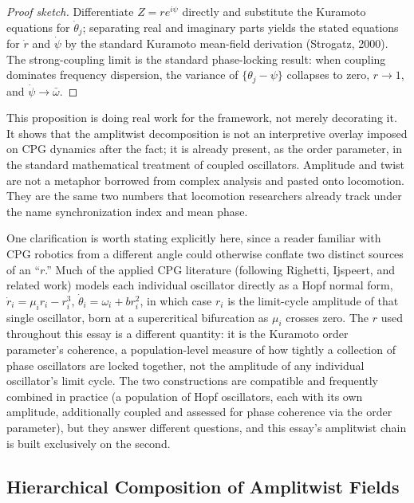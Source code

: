 \documentclass[12pt]{article}
\begin{document}
\begin{proof}[Proof sketch]
Differentiate $Z = r e^{i\psi}$ directly and substitute the Kuramoto equations for $\dot\theta_j$; separating real and imaginary parts yields the stated equations for $\dot r$ and $\dot\psi$ by the standard Kuramoto mean-field derivation (Strogatz, 2000). The strong-coupling limit is the standard phase-locking result: when coupling dominates frequency dispersion, the variance of $\{\theta_j - \psi\}$ collapses to zero, $r \to 1$, and $\dot\psi \to \bar\omega$.
\end{proof}

This proposition is doing real work for the framework, not merely decorating it. It shows that the amplitwist decomposition is not an interpretive overlay imposed on CPG dynamics after the fact; it is already present, as the order parameter, in the standard mathematical treatment of coupled oscillators. Amplitude and twist are not a metaphor borrowed from complex analysis and pasted onto locomotion. They are the same two numbers that locomotion researchers already track under the name synchronization index and mean phase.

One clarification is worth stating explicitly here, since a reader familiar with CPG robotics from a different angle could otherwise conflate two distinct sources of an ``$r$.'' Much of the applied CPG literature (following Righetti, Ijspeert, and related work) models each individual oscillator directly as a Hopf normal form, $\dot r_i = \mu_i r_i - r_i^3$, $\dot\theta_i = \omega_i + b r_i^2$, in which case $r_i$ is the limit-cycle amplitude of that single oscillator, born at a supercritical bifurcation as $\mu_i$ crosses zero. The $r$ used throughout this essay is a different quantity: it is the Kuramoto order parameter's coherence, a population-level measure of how tightly a collection of phase oscillators are locked together, not the amplitude of any individual oscillator's limit cycle. The two constructions are compatible and frequently combined in practice (a population of Hopf oscillators, each with its own amplitude, additionally coupled and assessed for phase coherence via the order parameter), but they answer different questions, and this essay's amplitwist chain is built exclusively on the second.

\subsection{Hierarchical Composition of Amplitwist Fields}
\end{document}
